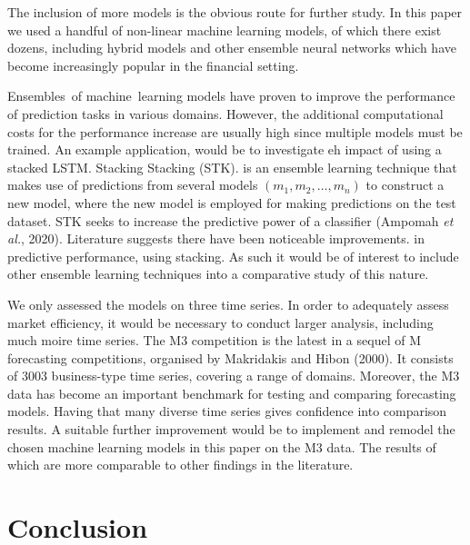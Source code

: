 The inclusion of more models is the obvious route for further study. In this paper we used a handful of non-linear machine learning models, of which there exist dozens, including hybrid models and other ensemble neural networks which have become increasingly popular in the financial setting. 

Ensembles of machine learning models have proven to improve the performance of prediction tasks in various domains. However, the additional computational costs for the performance increase are usually high since multiple models must be trained. An example application, would be to investigate eh impact of using a stacked LSTM. Stacking Stacking (STK). is an ensemble learning technique that makes use of predictions from several models $\left(m_{1}, m_{2}, \ldots, m_{n}\right)$ to construct a new model, where the new model is employed for making predictions on the test dataset. STK seeks to increase the predictive power of a classifier (Ampomah \textit{et al.}, 2020). Literature suggests there have been noticeable improvements. in predictive performance, using stacking. As such it would be of interest to include other ensemble learning techniques into a comparative study of this nature.

We only assessed the models on three time series. In order to adequately assess market efficiency, it would be necessary to conduct larger analysis, including much moire time series. The M3 competition is the latest in a sequel of M forecasting competitions, organised by Makridakis and Hibon (2000). It consists of 3003 business-type time series, covering a range of domains. Moreover, the M3 data has become an important benchmark for testing and comparing forecasting models. Having that many diverse time series gives confidence into comparison results. A suitable further improvement would be to implement and remodel the chosen machine learning models in this paper on the M3 data. The results of which are more comparable to other findings in the literature. 




\section{Conclusion}

